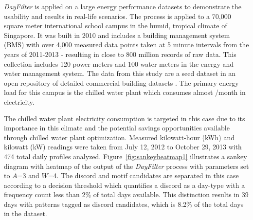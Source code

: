 \emph{DayFilter} is applied on a large energy performance datasets to demonstrate the usability and results in real-life scenarios. The process is applied to a 70,000 square meter international school campus in the humid, tropical climate of Singapore. It was built in 2010 and includes a building management system (BMS) with over 4,000 measured data points taken at 5 minute intervals from the years of 2011-2013 - resulting in close to 800 million records of raw data. This collection includes 120 power meters and 100 water meters in the energy and water management system. The data from this study are a seed dataset in an open repository of detailed commercial building datasets \cite{miller_seed_2014}. The primary energy load for this campus is the chilled water plant which consumes almost /month in electricity.

The chilled water plant electricity consumption is targeted in this case due to its importance in this climate and the potential savings opportunities available through chilled water plant optimization. Measured kilowatt-hour (kWh) and kilowatt (kW) readings were taken from July 12, 2012 to October 29, 2013 with 474 total daily profiles analyzed. Figure~\ref{fig:sankeyheatmap1} illustrates a sankey diagram with heatmap of the output of the \emph{DayFilter} process with parameters set to $A$=3 and $W$=4. The discord and motif candidates are separated in this case according to a decision threshold which quantifies a discord as a day-type with a frequency count less than 2\% of total days available. This distinction results in 39 days with patterns tagged as discord candidates, which is 8.2\% of the total days in the dataset. 